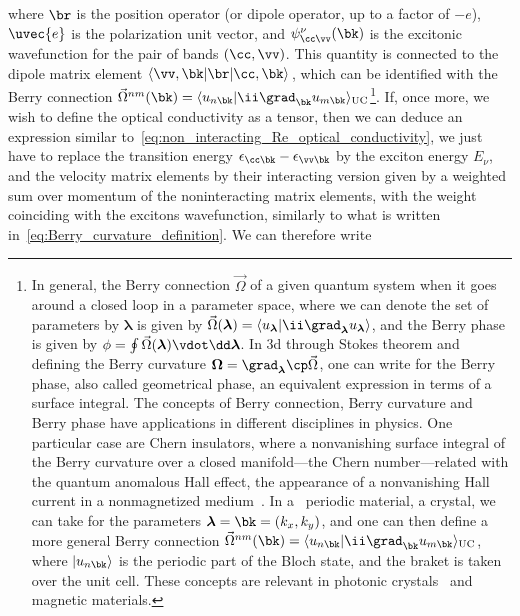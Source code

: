 \noindent where $\br$ is the position operator (or dipole operator, up to a factor of $-e$), $\uvec{e}$ is the polarization unit vector, and $\psi^{\nu}_{\cc  \vv } (\bk)$ is the excitonic wavefunction for the pair of bands $(\cc ,\vv )$.
This quantity is connected to the dipole matrix element $\langle \vv, \bk | \br | \cc , \bk \rangle$\,, which can be identified with the Berry connection $\vec{\Omega}^{n m}(\bk) = \langle u_{n \bk} | \ii \grad_{\bk} u_{m \bk} \rangle_{\mathrm{UC}}$\footnote{In general, the Berry connection $\vec{\Omega}$ of a given quantum system when it goes around a closed loop in a parameter space, where we can denote the set of parameters by $\boldsymbol{\lambda}$  is given by $\vec{\Omega}(\boldsymbol{\lambda}) = \langle u_{\boldsymbol{\lambda}} | \ii \grad_{\boldsymbol{\lambda}} u_{\boldsymbol{\lambda}} \rangle$, and the Berry phase is given by $\phi = \oint \vec{\Omega}(\boldsymbol{\lambda}) \vdot \dd \boldsymbol{\lambda}$. In \gls{3d} through Stokes theorem and defining the Berry curvature $\boldsymbol{\Omega} = \boldsymbol{\grad}_{\boldsymbol{\lambda}} \cp \vec{\Omega}$, one can write for the Berry phase, also called geometrical phase, an equivalent expression in terms of a surface integral. The concepts of Berry connection, Berry curvature and Berry phase have applications in different disciplines in physics. One particular case are Chern insulators, where a nonvanishing surface integral of the Berry curvature over a closed manifold---the Chern number---related with the quantum anomalous Hall effect, the appearance of a nonvanishing Hall current in a nonmagnetized medium~\cite{RevModPhys.82.1539}. In a \bd~periodic material, a crystal, we can take for the parameters $\boldsymbol{\lambda} = \bk = (k_x,k_y)$, and one can then define a more general Berry connection $\vec{\Omega}^{n m}(\bk) =  \langle u_{n \bk} | \ii \grad_{\bk} u_{m \bk} \rangle_{\mathrm{UC}}$, where $| u_{n \bk} \rangle$ is the periodic part of the Bloch state, and the braket is taken over the unit cell. These concepts are relevant in photonic crystals~\cite{PhysRevLett.115.253901,Zhao_2020} and magnetic materials.\label{fn:Berry_connection}}.
If, once more, we wish to define the optical conductivity as a tensor, then we can deduce an expression similar to~\eqref{eq:non_interacting_Re_optical_conductivity}, we just have to replace the transition energy $\epsilon_{\cc  \bk}-\epsilon_{\vv \bk}$ by the exciton energy $E_{\nu}$, and the velocity matrix elements by their interacting version given by a weighted sum over momentum of the noninteracting matrix elements, with the weight coinciding with the excitons wavefunction, similarly to what is written in~\eqref{eq:Berry_curvature_definition}.
We can therefore write


